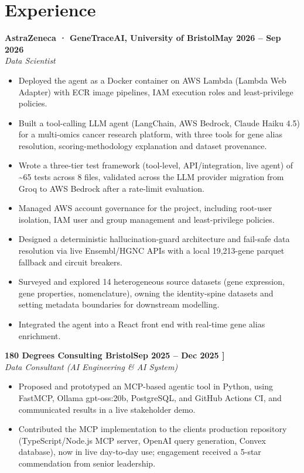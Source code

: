 \documentclass[a4paper,11pt]{article}
\newcommand{\entry}[4]{\needspace{4\baselineskip}\noindent\textbf{#1}\hfill\textbf{#2}\\ \textit{#3}\hfill\textit{#4}\par}
\begin{document}
\section{Experience}
\entry{AstraZeneca · GeneTraceAI, University of Bristol}{May 2026 – Sep 2026}{Data Scientist}{}
\begin{itemize}
  \item Deployed the agent as a Docker container on AWS Lambda (Lambda Web Adapter) with ECR image pipelines, IAM execution roles and least-privilege policies.
  \item Built a tool-calling LLM agent (LangChain, AWS Bedrock, Claude Haiku 4.5) for a multi-omics cancer research platform, with three tools for gene alias resolution, scoring-methodology explanation and dataset provenance.
  \item Wrote a three-tier test framework (tool-level, API/integration, live agent) of \textasciitilde{}65 tests across 8 files, validated across the LLM provider migration from Groq to AWS Bedrock after a rate-limit evaluation.
  \item Managed AWS account governance for the project, including root-user isolation, IAM user and group management and least-privilege policies.
  \item Designed a deterministic hallucination-guard architecture and fail-safe data resolution via live Ensembl/HGNC APIs with a local 19,213-gene parquet fallback and circuit breakers.
  \item Surveyed and explored 14 heterogeneous source datasets (gene expression, gene properties, nomenclature), owning the identity-spine datasets and setting metadata boundaries for downstream modelling.
  \item Integrated the agent into a React front end with real-time gene alias enrichment.
\end{itemize}
\vspace{4pt}
\entry{180 Degrees Consulting Bristol}{Sep 2025 – Dec 2025   ]}{Data Consultant (AI Engineering \& AI System)}{}
\begin{itemize}
  \item Proposed and prototyped an MCP-based agentic tool in Python, using FastMCP, Ollama gpt-oss:20b, PostgreSQL, and GitHub Actions CI, and communicated results in a live stakeholder demo.
  \item Contributed the MCP implementation to the client\textquotesingle{}s production repository (TypeScript/Node.js MCP server, OpenAI query generation, Convex database), now in live day-to-day use; engagement received a 5-star commendation from senior leadership.
\end{itemize}
\end{document}
